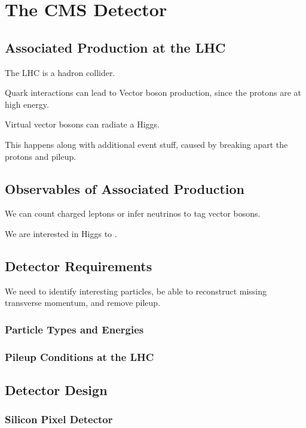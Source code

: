 \chapter{The CMS Detector}

\section{Associated Production at the LHC}

The LHC is a hadron collider.

Quark interactions can lead to Vector boson production,
since the protons are at high energy.

Virtual vector bosons can radiate a Higgs.

This happens along with additional event stuff,
caused by breaking apart the protons and pileup.

\section{Observables of Associated Production}

We can count charged leptons or infer neutrinos to tag vector bosons.

We are interested in Higgs to \bb.

\section{Detector Requirements}

We need to identify interesting particles,
be able to reconstruct missing transverse momentum,
and remove pileup.

\subsection{Particle Types and Energies}

\subsection{Pileup Conditions at the LHC}

\section{Detector Design}

\subsection{Silicon Pixel Detector}

